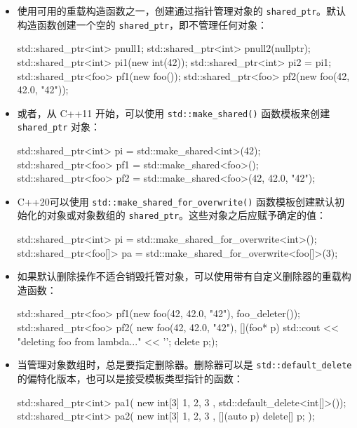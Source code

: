 \begin{itemize}
\item
使用可用的重载构造函数之一，创建通过指针管理对象的 \verb|shared_ptr|。默认构造函数创建一个空的 \verb|shared_ptr|，即不管理任何对象：

\begin{cpp}
std::shared_ptr<int> pnull1;
std::shared_ptr<int> pnull2(nullptr);
std::shared_ptr<int> pi1(new int(42));
std::shared_ptr<int> pi2 = pi1;
std::shared_ptr<foo> pf1(new foo());
std::shared_ptr<foo> pf2(new foo(42, 42.0, "42"));
\end{cpp}

\item
或者，从 C++11 开始，可以使用 \verb|std::make_shared()| 函数模板来创建 \verb|shared_ptr| 对象：

\begin{cpp}
std::shared_ptr<int> pi  = std::make_shared<int>(42);
std::shared_ptr<foo> pf1 = std::make_shared<foo>();
std::shared_ptr<foo> pf2 = std::make_shared<foo>(42, 42.0, "42");
\end{cpp}

\item
C++20可以使用 \verb|std::make_shared_for_overwrite()| 函数模板创建默认初始化的对象或对象数组的 \verb|shared_ptr|。这些对象之后应赋予确定的值：

\begin{cpp}
std::shared_ptr<int> pi = std::make_shared_for_overwrite<int>();
std::shared_ptr<foo[]> pa = std::make_shared_for_overwrite<foo[]>(3);
\end{cpp}

\item
如果默认删除操作不适合销毁托管对象，可以使用带有自定义删除器的重载构造函数：

\begin{cpp}
std::shared_ptr<foo> pf1(new foo(42, 42.0, "42"),
                         foo_deleter());
std::shared_ptr<foo> pf2(
new foo(42, 42.0, "42"),
    [](foo* p) {
        std::cout << "deleting foo from lambda..." << '\n';
        delete p;});
\end{cpp}

\item
当管理对象数组时，总是要指定删除器。删除器可以是 \verb|std::default_delete| 的偏特化版本，也可以是接受模板类型指针的函数：

\begin{cpp}
std::shared_ptr<int> pa1(
    new int[3]{ 1, 2, 3 },
        std::default_delete<int[]>());
std::shared_ptr<int> pa2(
    new int[3]{ 1, 2, 3 },
        [](auto p) {delete[] p; });


\end{cpp}
\end{itemize}
